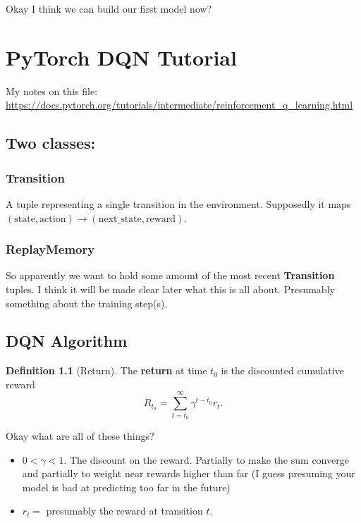 \documentclass[11pt,notitlepage]{report}
\theoremstyle{definition}
\newtheorem{definition}{Definition}
\theoremstyle{plain}
\begin{document}
Okay I think we can build our first model now?

\chapter{PyTorch DQN Tutorial}\label{chap:pytorch}

My notes on this file:
\url{https://docs.pytorch.org/tutorials/intermediate/reinforcement_q_learning.html}

\section{Two classes:}

\subsection{Transition}

A tuple representing a single transition in the environment.
Supposedly it maps
\((\text{state}, \text{action}) \rightarrow (\text{next\_state}, \text{reward})\).

\subsection{ReplayMemory}

So apparently we want to hold some amount of the most recent
\textbf{Transition} tuples.
I think it will be made clear later what this is all about. Presumably something
about the training step(s).

\section{DQN Algorithm}

\begin{definition}[Return]\label{def:return}
The \textbf{return} at time \(t_0\) is the discounted cumulative reward
\[
    R_{t_0} = \sum_{t=t_0}^{\infty} \gamma^{t-t_0} r_t.
\]
\end{definition}

Okay what are all of these things?

\begin{itemize}
    \item \(0 < \gamma < 1\). The discount on the reward. Partially to make
          the sum converge and partially to weight near rewards higher than
          far (I guess presuming your model is bad at predicting too far in
          the future)
    \item \(r_t =\) presumably the reward at transition \(t\).
\end{itemize}
\end{document}
